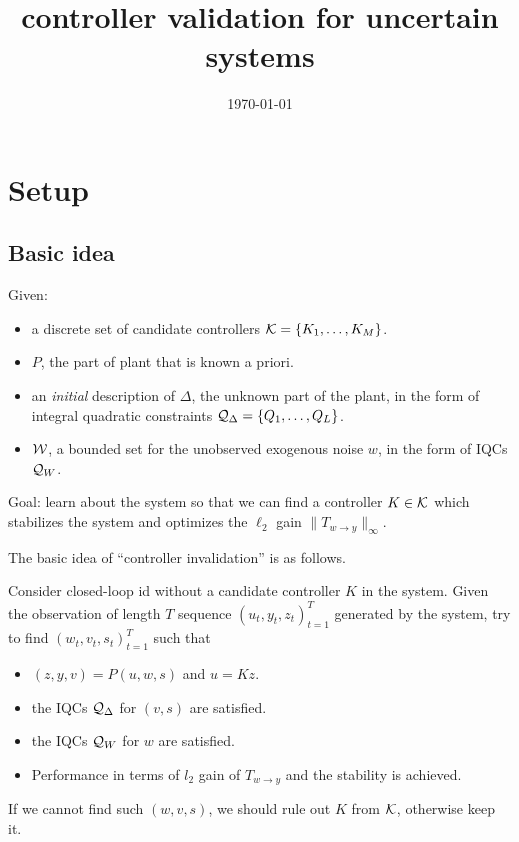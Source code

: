 \documentclass[11pt, onecolumn]{article}
\newcommand{\qq}[1]{{\color{magenta}{(#1)}}}
\begin{document}
\title{controller validation for uncertain systems}
\date{\today}

\maketitle


\setcounter{page}{1}

\section{Setup}

\subsection{Basic idea}

Given:
\begin{itemize}
\item a discrete set of candidate controllers $\mathcal K = \{K_1,\dots, K_M\}$.
\item  $P$, the part of plant that is known a priori.
\item an {\em initial} description of $\Delta$, the unknown part of the plant, in the form of
  integral quadratic constraints $\mathcal Q_\Delta = \{Q_1,\dots, Q_L\}$.
\item $\mathcal W$, a bounded set for the unobserved exogenous noise $w$, in the form of IQCs $\mathcal Q_{W}$.
\end{itemize}
Goal: learn about the system so that we can find a controller $K\in\mathcal K$ which stabilizes the
system and optimizes the $\ell_2$ gain $\|T_{w\to y}\|_{\infty}$.


The basic idea of ``controller invalidation'' is as follows.

Consider closed-loop id without a candidate controller $K$ in the system.  \qq{note that open loop
  id does not make sense here.}  Given the observation of length $T$ sequence $(u_t, y_t,
z_t)_{t=1}^{T}$ generated by the system, try to find $(w_t, v_t, s_t)_{t=1}^{T}$ such that
\begin{itemize}
\item $(z,y,v) = P(u,w,s)$ and $u = K z$.
\item the IQCs $\mathcal Q_\Delta$ for $(v, s)$ are satisfied.
\item the IQCs $\mathcal Q_{W}$ for $w$ are satisfied.
\item Performance in terms of $l_2$ gain of $T_{w\to y}$ and the stability is achieved.
\end{itemize}
If we cannot find such $(w,v,s)$, we should rule out $K$ from $\mathcal K$, otherwise keep it.
\end{document}

